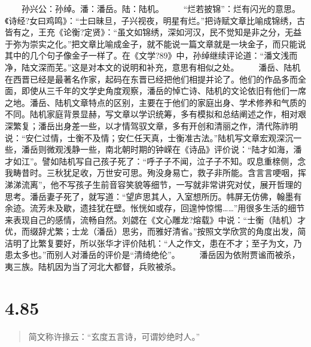 \documentclass[]{book}
\begin{document}
　　孙兴公：孙绰。潘：潘岳。陆：陆机。
　　``烂若披锦''：烂有闪光的意思。《诗经?女曰鸡鸣》：``士曰昧旦，子兴视夜，明星有烂。''把诗赋文章比喻成锦绣，古皆有之，王充《论衡?定贤》：``虽文如锦绣，深如河汉，民不觉知是非之分，无益于弥为崇实之化。''把文章比喻成金子，就不能说一篇文章就是一块金子，而只能说其中的几个句子像金子一样了。在《文学?89》中，孙绰继续评论道：``潘文浅而净，陆文深而芜。''这是对本文的说明和补充，意思有相似之处。
　　潘岳、陆机在西晋已经是最著名作家，起码在东晋已经把他们相提并论了。他们的作品多而全面，即使从三千年的文学史角度观察，潘岳的悼亡诗、陆机的文论依旧有他们一席之地。潘岳、陆机文章特点的区别，主要在于他们的家庭出身、学术修养和气质的不同。陆机家庭背景显赫，写文章以学识统筹，多有模拟和总结阐述之作，相对艰深繁复；潘岳出身差一些，以才情驾驭文章，多有开创和清丽之作，清代陈祚明说：``安仁过情，士衡不及情；安仁任天真，士衡准古法。''陆机写文章宏观深沉一些，潘岳则微观浅静一些，南北朝时期的钟嵘在《诗品》评价说：``陆才如海，潘才如江''。譬如陆机写自己孩子死了：``呼子子不闻，泣子子不知。叹息重榇侧，念我畴昔时。三秋犹足收，万世安可思。殉没身易亡，救子非所能。含言言哽咽，挥涕涕流离''，他不写孩子生前音容笑貌等细节，一写就非常讲究对仗，展开哲理的思考。潘岳妻子死了，就写道：``望庐思其人，入室想所历。帏屏无仿佛，翰墨有余迹。流芳未及歇，遗挂犹在壁。怅恍如或存，回遑忡惊惕\ldots{}\ldots{}''用很多生活的细节来表现自己的感情，流畅自然。刘勰在《文心雕龙?熔载》中说：``士衡（陆机）才优，而缀辞尤繁；士龙（潘岳）思劣，而雅好清省。''按照文学欣赏的角度出发，简洁明了比繁复要好，所以张华才评价陆机：``人之作文，患在不才；至子为文，乃患太多也。''而别人对潘岳的评价是``清绮绝伦''。
　　潘岳因为依附贾谧而被杀，夷三族。陆机因为当了河北大都督，兵败被杀。

\section{4.85}\label{section-262}

\begin{quote}
简文称许掾云：``玄度五言诗，可谓妙绝时人。''
\end{quote}
\end{document}
